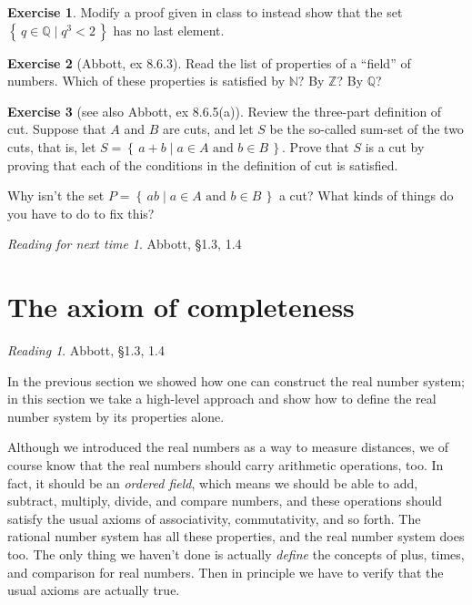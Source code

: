 \documentclass[11pt,oneside]{amsbook}
\newcommand{\set}[1]{\left\{\,#1\,\right\}}
\newcommand{\N}{\mathbb N}
\newcommand{\Z}{\mathbb Z}
\newcommand{\Q}{\mathbb Q}
\theoremstyle{definition}
\newtheorem{exerc}{Exercise}[section]
\theoremstyle{plain}
\theoremstyle{definition}
\theoremstyle{remark}
\newtheorem*{reading}{Reading}
\newtheorem*{readnext}{Reading for next time}
\numberwithin{equation}{section}
\numberwithin{figure}{section}
\begin{document}
\begin{exerc}
  Modify a proof given in class to instead show that the set
$\set{q\in\Q\mid q^3<2}$ has no last element.
\end{exerc}

\begin{exerc}[Abbott, ex 8.6.3]
  Read the list of properties of a ``field'' of numbers.  Which of these properties is satisfied by $\N$?  By $\Z$?  By $\Q$?
\end{exerc}

\begin{exerc}[see also Abbott, ex 8.6.5(a)]
  Review the three-part definition of cut. Suppose that $A$ and $B$ are cuts, and let $S$ be the so-called sum-set of the two cuts, that is, let $S=\set{a+b\mid a\in A\text{ and }b\in B}$. Prove that $S$ is a cut by proving that each of the conditions in the definition of cut is satisfied.

  Why isn't the set $P=\set{ab\mid a\in A\text{ and }b\in B}$ a cut?  What kinds of things do you have to do to fix this?
\end{exerc}



\begin{readnext}
  Abbott, \S 1.3, 1.4
\end{readnext}

\newpage
\section{The axiom of completeness}

\begin{reading}
  Abbott, \S 1.3, 1.4
\end{reading}

In the previous section we showed how one can construct the real number system; in this section we take a high-level approach and show how to define the real number system by its properties alone.

Although we introduced the real numbers as a way to measure distances, we of course know that the real numbers should carry arithmetic operations, too. In fact, it should be an \emph{ordered field}, which means we should be able to add, subtract, multiply, divide, and compare numbers, and these operations should satisfy the usual axioms of associativity, commutativity, and so forth. The rational number system has all these properties, and the real number system does too. The only thing we haven't done is actually \emph{define} the concepts of plus, times, and comparison for real numbers. Then in principle we have to verify that the usual axioms are actually true.
\end{document}
